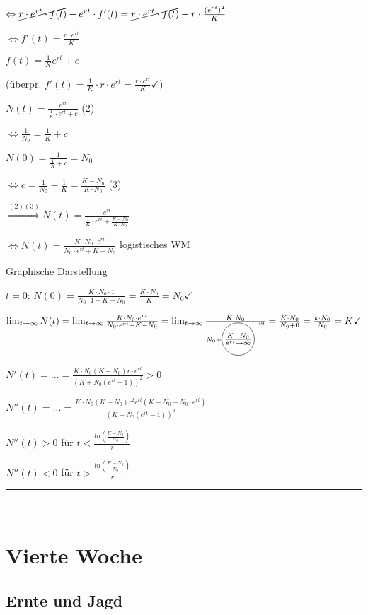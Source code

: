 \documentclass[18pt,a4paper]{scrreprt}
\newcommand*\circled[1]{\tikz[baseline=(char.base)]{
            \node[shape=circle,draw,inner sep=1pt] (char) {#1};}}
\begin{document}
$\Leftrightarrow \cancel{r\cdot e^{rt} \cdot f(t)} - e^{rt} \cdot f'(t) = \cancel{r\cdot e^{rt} \cdot f(t)} - r\cdot \frac{(e^{rt})^2}{K}$

$\Leftrightarrow f'(t) = \frac{r\cdot e^{rt}}{K}$

$f(t) = \frac{1}{K} e^{rt} + c$

(überpr. $f'(t) = \frac{1}{K} \cdot r \cdot e^{rt} = \frac{r\cdot e^{rt}}{K} \checkmark$)

$N(t)= \frac{e^{rt}}{\frac{1}{K}\cdot e^{rt} + c}$ (2)

$\Leftrightarrow \frac{1}{N_0} = \frac{1}{K} + c$

$N(0) = \frac{1}{\frac{1}{K} + c} = N_0$

$\Leftrightarrow c = \frac{1}{N_0} - \frac{1}{K} = \frac{K-N_0}{K\cdot N_0}$ (3)

$\stackrel{(2)(3)}{\Rightarrow} N(t) = \frac{e^{rt}}{\frac{1}{K} \cdot e^{rt} + \frac{K-N_0}{K\cdot N_0}}$

$\Leftrightarrow N(t) = \frac{K\cdot N_0 \cdot e^{rt}}{N_0 \cdot e^{rt} + K -N_0}$ logistisches WM

\uline{Graphische Darstellung} 

$t=0$: $N(0) = \frac{K\cdot N_0 \cdot 1}{N_0 \cdot 1 + K - N_0} = \frac{K\cdot N_0}{K} = N_0 \checkmark$

$\lim_{t\to \infty} N(t) = \lim_{t\to \infty} \frac{K\cdot N_0 \cdot e^{rt}}{N_0 \cdot e^{rt} + K -N_0} = \lim_{t\to \infty} \frac{K\cdot N_0}{N_0 + \circled{$\frac{K -N_0}{e^{rt}\rightarrow \infty}$}^{\rightarrow 0}} = \frac{K\cdot N_0}{N_0 + 0} = \frac{k\cdot N_0}{N_0} = K \checkmark$

$N'(t) = ... = \frac{K\cdot N_0 (K-N_0) r \cdot e^{et}}{(K+N_0(e^{rt} - 1))^2} > 0$

$N''(t) = ... = \frac{K\cdot N_0 (K-N_0) r^2 e^{rt} (K-N_0 -N_0\cdot e^{rt})}{(K+N_0(e^{rt}-1))^3}$

$N''(t) > 0$ für $t < \frac{ln(\frac{K-N_0}{N_0})}{r}$

$N''(t) < 0$ für $t > \frac{ln(\frac{K-N_0}{N_0})}{r}$

\rule{\textwidth}{0.4mm}\\

\chapter{Vierte Woche}

\section{Ernte und Jagd}
\end{document}
